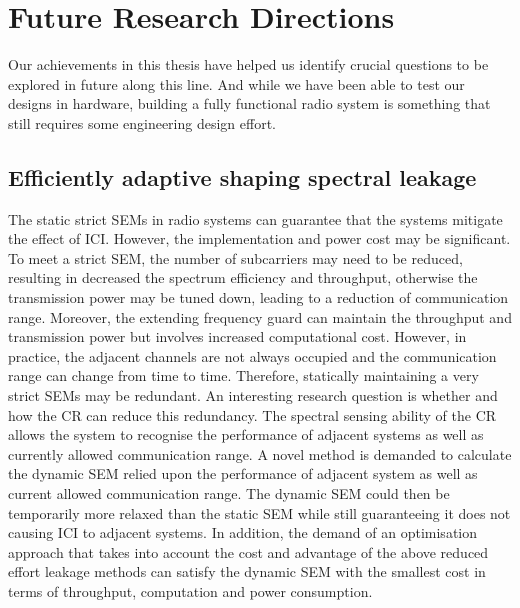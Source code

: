 \section{Future Research Directions}

Our achievements in this thesis have helped us identify crucial questions to be explored in future along this line. And while we have been able to test our designs in hardware, building a fully functional radio system is something that still requires some engineering design effort.

\subsection{Efficiently adaptive shaping spectral leakage}
The static strict SEMs in radio systems can guarantee that the systems mitigate the effect of ICI. However, the implementation and power cost may be significant.
To meet a strict SEM, the number of subcarriers may need to be reduced, resulting in decreased the spectrum efficiency and throughput, otherwise the transmission power may be tuned down, leading to a reduction of communication range.
Moreover, the extending frequency guard can maintain the throughput and transmission power but involves increased computational cost.
However, in practice, the adjacent channels are not always occupied and the communication range can change from time to time. Therefore, statically maintaining a very strict SEMs may be redundant.
An interesting research question is whether and how the CR can reduce this redundancy.
The spectral sensing ability of the CR allows the system to recognise the performance of adjacent systems as well as currently allowed communication range.
A novel method is demanded to calculate the dynamic SEM relied upon the performance of adjacent system as well as current allowed communication range.
The dynamic SEM could then be temporarily more relaxed than the static SEM while still guaranteeing it does not causing ICI to adjacent systems.
In addition, the demand of an optimisation approach that takes into account the cost and advantage of the above reduced effort leakage methods can satisfy the dynamic SEM with the smallest cost in terms of throughput, computation and power consumption.

